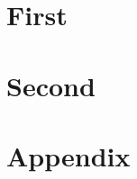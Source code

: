\documentclass[]{./Bachelor}
\begin{document}
\frontmatter




\tableofcontents*

\mainmatter
\clearpage
\pagestyle{ruled}

\chapter{First}\nocite{*}
\label{cha:first}



\kant

\chapter{Second}
\label{cha:second}

\medskip

\printbibliography


\appendix

\chapter{Appendix}

\kant
\end{document}
